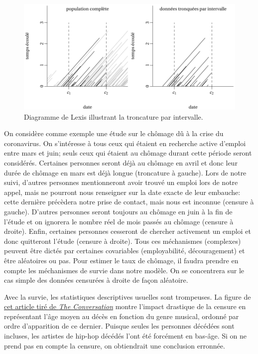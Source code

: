 \documentclass[
  11pt,
  letterpaper,
]{scrbook}
\theoremstyle{definition}
\theoremstyle{remark}
\begin{document}
\begin{figure}[ht!]

{\centering \includegraphics[width=1\textwidth,height=\textheight]{./figures/lexis_troncationintervalle.pdf}

}

\caption{\label{fig-troncatureintervalle}Diagramme de Lexis illustrant
la troncature par intervalle.}

\end{figure}

On considère comme exemple une étude sur le chômage dû à la crise du
coronavirus. On s'intéresse à tous ceux qui étaient en recherche active
d'emploi entre mars et juin; seuls ceux qui étaient au chômage durant
cette période seront considérés. Certaines personnes seront déjà au
chômage en avril et donc leur durée de chômage en mars est déjà longue
(troncature à gauche). Lors de notre suivi, d'autres personnes
mentionneront avoir trouvé un emploi lors de notre appel, mais ne
pourront nous renseigner sur la date exacte de leur embauche: cette
dernière précèdera notre prise de contact, mais nous est inconnue
(censure à gauche). D'autres personnes seront toujours au chômage en
juin à la fin de l'étude et on ignorera le nombre réel de mois passés au
chômage (censure à droite). Enfin, certaines personnes cesseront de
chercher activement un emploi et donc quitteront l'étude (censure à
droite). Tous ces méchanismes (complexes) peuvent être dictés par
certaines covariables (employabilité, découragement) et être aléatoires
ou pas. Pour estimer le taux de chômage, il faudra prendre en compte les
méchanismes de survie dans notre modèle. On se concentrera sur le cas
simple des données censurées à droite de façon aléatoire.

Avec la survie, les statistiques descriptives usuelles sont trompeuses.
La figure de
\href{https://theconversation.com/music-to-die-for-how-genre-affects-popular-musicians-life-expectancy-36660}{cet
article tiré de \emph{The Conversation}} montre l'impact drastique de la
censure en représentant l'âge moyen au décès en fonction du genre
musical, ordonné par ordre d'apparition de ce dernier. Puisque seules
les personnes décédées sont incluses, les artistes de hip-hop décédés
l'ont été forcément en bas-âge. Si on ne prend pas en compte la censure,
on obtiendrait une conclusion erronnée.
\end{document}
